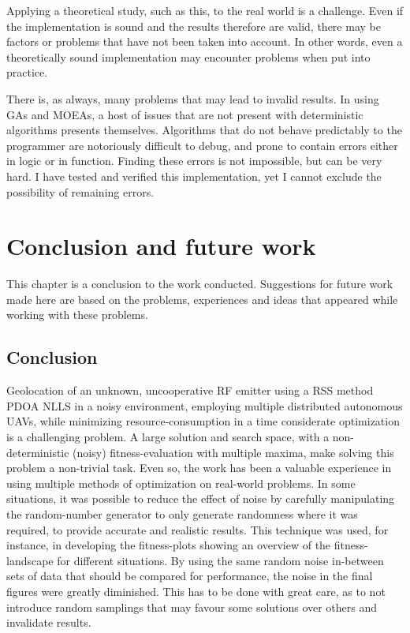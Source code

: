 \documentclass[10pt,a4paper]{book}
\begin{document}
Applying a theoretical study, such as this, to the real world is a challenge. Even if the implementation is sound and the results therefore are valid, there may be factors or problems that have not been taken into account. In other words, even a theoretically sound implementation may encounter problems when put into practice.

There is, as always, many problems that may lead to invalid results. In using  \glspl{GA} and \glspl{MOEA}, a host of issues that are not present with deterministic algorithms presents themselves. Algorithms that do not behave predictably to the programmer are notoriously difficult to debug, and prone to contain errors either in logic or in function. Finding these errors is not impossible, but can be very hard. I have tested and verified this implementation, yet I cannot exclude the possibility of remaining errors. 






\chapter{Conclusion and future work}

This chapter is a conclusion to the work conducted. Suggestions for future work made here are based on the problems, experiences and ideas that appeared while working with these problems.


\newpage





\section{Conclusion}


Geolocation of an unknown, uncooperative \gls{RF} emitter using a \gls{RSS} method \gls{PDOA} \gls{NLLS} in a noisy environment, employing multiple distributed autonomous \glspl{UAV}, while minimizing resource-consumption in a time considerate optimization is a challenging problem. A large solution and search space, with a non-deterministic (noisy) fitness-evaluation with multiple maxima, make solving this problem a non-trivial task. Even so, the work has been a valuable experience in using multiple methods of optimization on real-world problems. In some situations, it was possible to reduce the effect of noise by carefully manipulating the random-number generator to only generate randomness where it was required, to provide accurate and realistic results. This technique was used, for instance, in developing the fitness-plots showing an overview of the fitness-landscape for different situations. By using the same random noise in-between sets of data that should be compared for performance, the noise in the final figures were greatly diminished. This has to be done with great care, as to not introduce random samplings that may favour some solutions over others and invalidate results.
\end{document}
